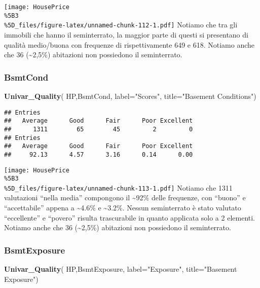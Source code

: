 \documentclass[
]{article}
\newenvironment{Shaded}{\begin{snugshade}}{\end{snugshade}}
\newcommand{\AttributeTok}[1]{\textcolor[rgb]{0.13,0.29,0.53}{#1}}
\newcommand{\FunctionTok}[1]{\textcolor[rgb]{0.13,0.29,0.53}{\textbf{#1}}}
\newcommand{\NormalTok}[1]{#1}
\newcommand{\StringTok}[1]{\textcolor[rgb]{0.31,0.60,0.02}{#1}}
\begin{document}
\texttt{[image: HousePrice\\\%5B3\\\%5D\_files/figure-latex/unnamed-chunk-112-1.pdf]}
Notiamo che tra gli immobili che hanno il seminterrato, la maggior parte
di questi si presentano di qualità medio/buona con frequenze di
rispettivamente 649 e 618. Notiamo anche che 36 (\textasciitilde2,5\%)
abitazioni non possiedono il seminterrato.

\subsubsection{BsmtCond}\label{bsmtcond}

\begin{Shaded}
\begin{Highlighting}[]
\FunctionTok{Univar\_Quality}\NormalTok{(}
\NormalTok{  HP,BsmtCond,}
  \AttributeTok{label=}\StringTok{"Scores"}\NormalTok{,}
  \AttributeTok{title=}\StringTok{"Basement Conditions"}\NormalTok{)}
\end{Highlighting}
\end{Shaded}

\begin{verbatim}
## Entries
##   Average      Good      Fair      Poor Excellent 
##      1311        65        45         2         0 
## Entries
##   Average      Good      Fair      Poor Excellent 
##     92.13      4.57      3.16      0.14      0.00
\end{verbatim}

\texttt{[image: HousePrice\\\%5B3\\\%5D\_files/figure-latex/unnamed-chunk-113-1.pdf]}
Notiamo che 1311 valutazioni ``nella media'' compongono il
\textasciitilde92\% delle frequenze, con ``buono'' e ``accettabile''
appena a \textasciitilde4.6\% e \textasciitilde3.2\%. Nessun
seminterrato è stato valutato ``eccellente'' e ``povero'' risulta
trascurabile in quanto applicata solo a 2 elementi. Notiamo anche che 36
(\textasciitilde2,5\%) abitazioni non possiedono il seminterrato.

\subsubsection{BsmtExposure}\label{bsmtexposure}

\begin{Shaded}
\begin{Highlighting}[]
\FunctionTok{Univar\_Quality}\NormalTok{(}
\NormalTok{  HP,BsmtExposure,}
  \AttributeTok{label=}\StringTok{"Exposure"}\NormalTok{,}
  \AttributeTok{title=}\StringTok{"Basement Exposure"}\NormalTok{)}
\end{Highlighting}
\end{Shaded}
\end{document}
